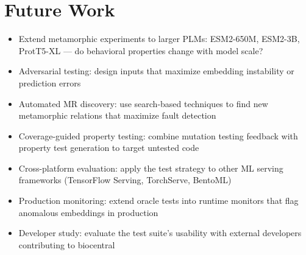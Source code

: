 \section{Future Work}\label{sec:future-work}
\begin{itemize}
  \item Extend metamorphic experiments to larger PLMs: ESM2-650M, ESM2-3B, ProtT5-XL --- do behavioral properties change with model scale?
  \item Adversarial testing: design inputs that maximize embedding instability or prediction errors
  \item Automated MR discovery: use search-based techniques to find new metamorphic relations that maximize fault detection
  \item Coverage-guided property testing: combine mutation testing feedback with property test generation to target untested code
  \item Cross-platform evaluation: apply the test strategy to other ML serving frameworks (TensorFlow Serving, TorchServe, BentoML)
  \item Production monitoring: extend oracle tests into runtime monitors that flag anomalous embeddings in production
  \item Developer study: evaluate the test suite's usability with external developers contributing to biocentral
\end{itemize}

